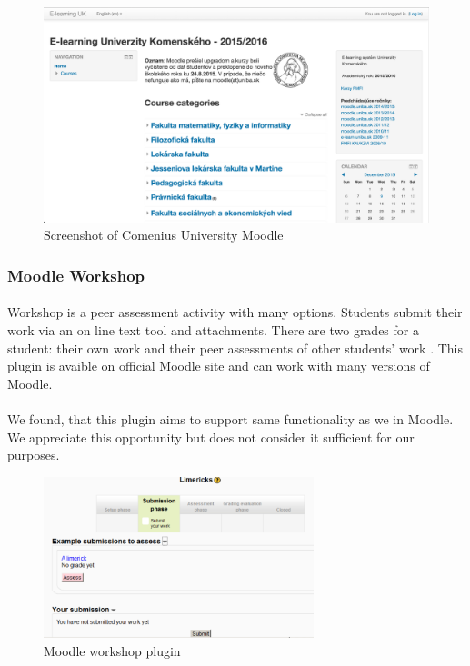 \begin{figure}[t]
    \centering
    \includegraphics[width=\textwidth]{courses/moodle.png}
    \caption{Screenshot of Comenius University Moodle}
    \label{moodle_pic}
\end{figure}

\subsubsection{Moodle Workshop}
\paragraph{}
Workshop is a peer assessment activity with many options. Students submit their work via an on line text tool and attachments. There are two grades for a student: their own work and their peer assessments of other students' work
\cite{moodleworkshop}. This plugin is avaible on official Moodle site and can work with many versions of Moodle. 

\paragraph{}
We found, that this plugin aims to support same functionality as we in Moodle. We appreciate this opportunity but does not consider it sufficient for our purposes.

\begin{figure}[t]
    \centering
    \includegraphics[width=0.7\textwidth]{courses/moodleworkshop.png}
    \caption{Moodle workshop plugin}
    \label{moodle_workshop}
\end{figure}

